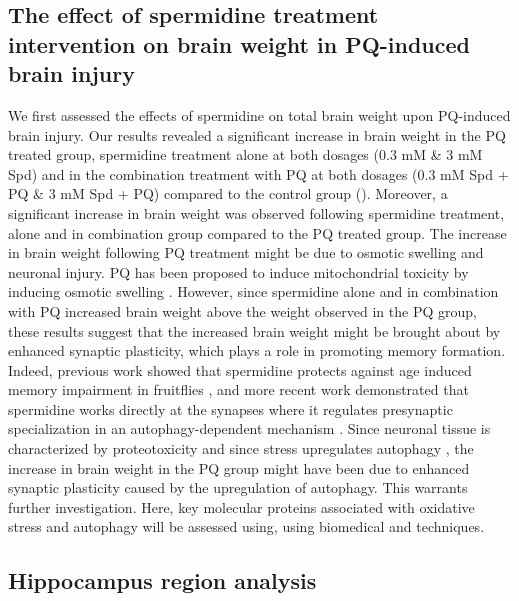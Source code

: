 \subsection{The effect of spermidine treatment intervention on brain weight in PQ-induced brain injury}
We first assessed the effects of spermidine on total brain weight upon PQ-induced brain injury. Our results revealed a significant increase in brain weight in the PQ treated group, spermidine treatment alone at both dosages (0.3 mM \& 3 mM Spd) and in the combination treatment with PQ at both dosages (0.3 mM Spd + PQ \& 3 mM Spd + PQ) compared to the control group (). Moreover, a significant increase in brain weight was observed following spermidine treatment, alone and in combination group compared to the PQ treated group. The increase in brain weight following PQ treatment might be due to osmotic swelling and neuronal injury. PQ has been proposed to induce mitochondrial toxicity by inducing osmotic swelling \citep{Cappelletti1996,Mohammadi-Bardbori2008}. However, since spermidine alone and in combination with PQ increased brain weight above the weight observed in the PQ group, these results suggest that the increased brain weight might be brought about by enhanced synaptic plasticity, which plays a role in promoting memory formation. Indeed, previous work showed that spermidine protects against age induced memory impairment in fruitflies \citep{Gupta2016,Gupta2013,Sigrist2014}, and more recent work demonstrated that spermidine works directly at the synapses where it regulates presynaptic specialization in an autophagy-dependent mechanism \citep{Bhukel2017}. Since neuronal tissue is characterized by proteotoxicity and since stress upregulates autophagy \citep{Petrovski2011,Yorimitsu2006}, the increase in brain weight in the PQ group might have been due to enhanced synaptic plasticity caused by the upregulation of autophagy. This warrants further investigation. Here, key molecular proteins associated with oxidative stress and autophagy will be assessed using, using biomedical and techniques.

\subsection{Hippocampus region analysis} 

